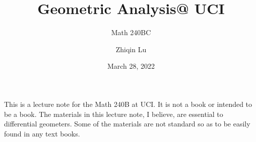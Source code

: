 \documentclass[lang=en,11pt,green,fancy]{elegantbook}
\title{Geometric Analysis@ UCI}
\subtitle{Math 240BC}
\author{Zhiqin Lu}
\institute{University of California, Irvine}
\date{March 28, 2022}
\numberwithin{equation}{chapter}
\begin{document}
\maketitle
\frontmatter
\tableofcontents
\mainmatter

\newpage




















\nocite{*}

\printbibliography


\newpage


\begin{remark}
This is a lecture note for the Math 240B at UCI. It is not a book or intended to be a book. The materials in this lecture note, I believe, are essential to differential geometers. Some of the materials are not standard so as to be easily found in  any text books.
\end{remark}

\vspace{2in}
\end{document}
